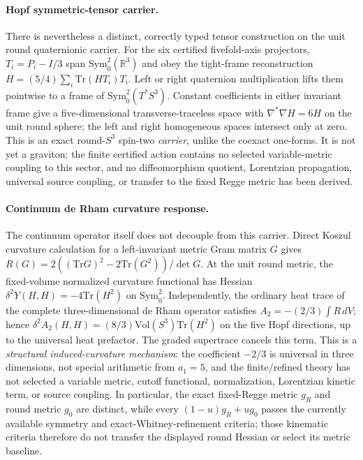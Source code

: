 \documentclass[12pt,a4paper]{article}
\theoremstyle{definition}
\begin{document}
\paragraph{Hopf symmetric-tensor carrier.}
There is nevertheless a distinct, correctly typed tensor construction on the unit round quaternionic carrier.  For the six certified fivefold-axis projectors, $T_i=P_i-I/3$ span $\mathrm{Sym}^2_0(\mathbb{R}^3)$ and obey the tight-frame reconstruction $H=(5/4)\sum_i\mathrm{Tr}(HT_i)T_i$.  Left or right quaternion multiplication lifts them pointwise to a frame of $\mathrm{Sym}^2_0(T^*S^3)$.  Constant coefficients in either invariant frame give a five-dimensional transverse-traceless space with $\nabla^*\nabla H=6H$ on the unit round sphere; the left and right homogeneous spaces intersect only at zero.  This is an exact round-$S^3$ spin-two \emph{carrier}, unlike the coexact one-forms.  It is not yet a graviton: the finite certified action contains no selected variable-metric coupling to this sector, and no diffeomorphism quotient, Lorentzian propagation, universal source coupling, or transfer to the fixed Regge metric has been derived.

\paragraph{Continuum de Rham curvature response.}
The continuum operator itself does not decouple from this carrier.  Direct Koszul curvature calculation for a left-invariant metric Gram matrix $G$ gives $R(G)=2((\mathrm{Tr}G)^2-2\mathrm{Tr}(G^2))/\det G$.  At the unit round metric, the fixed-volume normalized curvature functional has Hessian $\delta^2Y(H,H)=-4\mathrm{Tr}(H^2)$ on $\mathrm{Sym}^2_0$.  Independently, the ordinary heat trace of the complete three-dimensional de Rham operator satisfies $A_2=-(2/3)\int R\,dV$; hence $\delta^2A_2(H,H)=(8/3)\mathrm{Vol}(S^3)\mathrm{Tr}(H^2)$ on the five Hopf directions, up to the universal heat prefactor.  The graded supertrace cancels this term.  This is a \emph{structural induced-curvature mechanism}: the coefficient $-2/3$ is universal in three dimensions, not special arithmetic from $a_1=5$, and the finite/refined theory has not selected a variable metric, cutoff functional, normalization, Lorentzian kinetic term, or source coupling.  In particular, the exact fixed-Regge metric $g_R$ and round metric $g_0$ are distinct, while every $(1-u)g_R+ug_0$ passes the currently available symmetry and exact-Whitney-refinement criteria; those kinematic criteria therefore do not transfer the displayed round Hessian or select its metric baseline.
\end{document}
